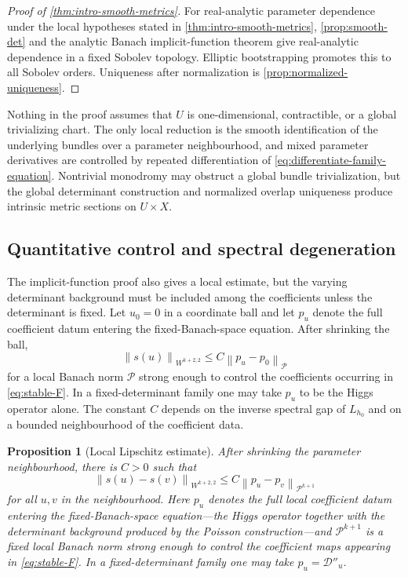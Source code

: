 \documentclass[11pt,reqno]{amsart}
\newtheorem{proposition}[theorem]{Proposition}
\theoremstyle{definition}
\theoremstyle{remark}
\newcommand{\cD}{\mathcal D}
\newcommand{\norm}[1]{\left\lVert #1\right\rVert}
\begin{document}
\begin{proof}[Proof of \cref{thm:intro-smooth-metrics}]
For real-analytic parameter dependence under the local hypotheses stated in \cref{thm:intro-smooth-metrics}, \cref{prop:smooth-det} and the analytic Banach implicit-function theorem give real-analytic dependence in a fixed Sobolev topology.  Elliptic bootstrapping promotes this to all Sobolev orders.  Uniqueness after normalization is \cref{prop:normalized-uniqueness}.
\end{proof}


Nothing in the proof assumes that $U$ is one-dimensional, contractible,
or a global trivializing chart.  The only local reduction is the smooth
identification of the underlying bundles over a parameter
neighbourhood, and mixed parameter derivatives are controlled by
repeated differentiation of \eqref{eq:differentiate-family-equation}.
Nontrivial monodromy may obstruct a global bundle trivialization, but
the global determinant construction and normalized overlap uniqueness
produce intrinsic metric sections on $U\times X$.

\subsection{Quantitative control and spectral degeneration}

The implicit-function proof also gives a local estimate, but the varying determinant background must be included among the coefficients unless the determinant is fixed.  Let $u_0=0$ in a coordinate ball and let $p_u$ denote the full coefficient datum entering the fixed-Banach-space equation.  After shrinking the ball,
\begin{equation}\label{eq:quantitative-s-estimate}
  \norm{s(u)}_{W^{k+2,2}}
  \le C\norm{p_u-p_0}_{\mathcal P}
\end{equation}
for a local Banach norm $\mathcal P$ strong enough to control the coefficients occurring in \eqref{eq:stable-F}.  In a fixed-determinant family one may take $p_u$ to be the Higgs operator alone.  The constant $C$ depends on the inverse spectral gap of $L_{h_0}$ and on a bounded neighbourhood of the coefficient data.

\begin{proposition}[Local Lipschitz estimate]\label{prop:local-Lipschitz}
After shrinking the parameter neighbourhood, there is $C>0$ such that
\[
  \norm{s(u)-s(v)}_{W^{k+2,2}}
  \le C\norm{p_u-p_v}_{\mathcal P^{k+1}}
\]
for all $u,v$ in the neighbourhood.  Here $p_u$ denotes the full local coefficient datum entering the fixed-Banach-space equation---the Higgs operator together with the determinant background produced by the Poisson construction---and $\mathcal P^{k+1}$ is a fixed local Banach norm strong enough to control the coefficient maps appearing in \eqref{eq:stable-F}.  In a fixed-determinant family one may take $p_u=\cD''_u$.
\end{proposition}
\end{document}
